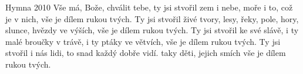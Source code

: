 \begin{TEXT}{Hymna 2010}
\SLOKA  Vše má, Bože, chválit tebe,
ty jsi stvořil zem i nebe, 
moře i to, což je v nich, 
vše je dílem rukou tvých.
\SLOKA Ty jsi stvořil živé tvory, 
lesy, řeky, pole, hory, 
slunce, hvězdy ve výších, 
vše je dílem rukou tvých.
\SLOKA Ty jsi stvořil ke své slávě, 
i ty malé broučky v trávě, 
i ty ptáky ve větvích, 
vše je dílem rukou tvých.
\SLOKA Ty jsi stvořil i nás lidi, 
to snad každý dobře vidí. 
taky děti, jejich smích
vše je dílem rukou tvých. 
\end{TEXT}